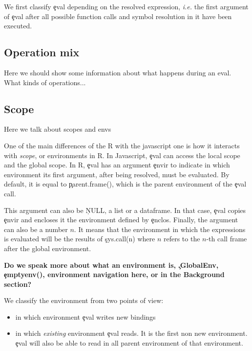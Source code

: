 \documentclass[conference]{IEEEtran}
\begin{document}
We first classify \c{eval} depending on the resolved expression, \emph{i.e.}
the first argument of \c{eval} after all possible function calls and symbol
resolution in it have been executed.

\subsection{Operation mix}

Here we should show some information about what happens during an eval. What kinds of operations...



\subsection{Scope}

Here we talk about scopes and envs

One of the main differences of the R \eval with the javascript one is how it
interacts with \emph{scope}, or environments in R. In Javascript, \c{eval}
can access the local scope and the global scope. In R, \c{eval} has an
argument \c{envir} to indicate in which environment its first argument,
after being resolved, must be evaluated. By default, it is equal to \c{parent.frame()}, which is the parent environment of the \c{eval} call.

 This argument can also be \c{NULL}, a list or a dataframe. In that case, \c{eval} copies \c{envir} and encloses it the environment defined by \c{enclos}. Finally, the argument can also be a number $n$. It means that the environment in which the expressions is evaluated will be the results of \c{sys.call(n)} where $n$ refers to the $n$-th call frame after the global environment.

\textbf{Do we speak more about what an environment is, \c{.GlobalEnv}, \c{emptyenv()}, environment navigation here, or in the Background section?}

We classify the environment from two points of view:
\begin{itemize}
	\item in which environment \c{eval} writes new bindings 
	\item in which \emph{existing} environment \c{eval} reads. It is the first non new environment. \c{eval} will also be able to read in all parent environment of that environment. 
\end{itemize}

\end{document}
